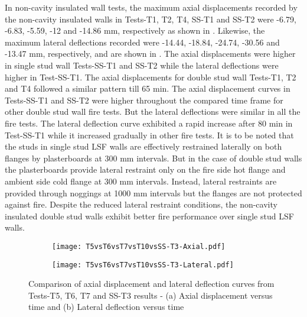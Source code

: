In non-cavity insulated wall tests, the maximum axial displacements recorded by the non-cavity insulated walls in Tests-T1, T2, T4, SS-T1 and SS-T2 were -6.79, -6.83, -5.59, -12 and -14.86 mm, respectively as shown in . Likewise, the maximum lateral deflections recorded were -14.44, -18.84, -24.74, -30.56 and -13.47 mm, respectively, and are shown in . The axial displacements were higher in single stud wall Tests-SS-T1 and SS-T2 while the lateral deflections were higher in Test-SS-T1. The axial displacements for double stud wall Tests-T1, T2 and T4 followed a similar pattern till 65 min. The axial displacement curves in Tests-SS-T1 and SS-T2 were higher throughout the compared time frame for other double stud wall fire tests. But the lateral deflections were similar in all the fire tests. The lateral deflection curve exhibited a rapid increase after 80 min in Test-SS-T1 while it increased gradually in other fire tests. It is to be noted that the studs in single stud LSF walls are effectively restrained laterally on both flanges by plasterboards at 300 mm intervals. But in the case of double stud walls the plasterboards provide lateral restraint only on the fire side hot flange and ambient side cold flange at 300 mm intervals. Instead, lateral restraints are provided through noggings at 1000 mm intervals but the flanges are not protected against fire. Despite the reduced lateral restraint conditions, the non-cavity insulated double stud walls exhibit better fire performance over single stud LSF walls.
\begin{figure}[!htbp]
	\centering
	\begin{subfigure}[b]{0.7\textwidth}
		\centering
		\texttt{[image: T5vsT6vsT7vsT10vsSS-T3-Axial.pdf]}
		\caption{}
		\label{subfig:T5vsT6vsT7vsT10vsSS-T3-Axial}
	\end{subfigure}
	\begin{subfigure}[b]{0.7\textwidth}
		\centering
		\texttt{[image: T5vsT6vsT7vsT10vsSS-T3-Lateral.pdf]}
		\caption{}
		\label{subfig:T5vsT6vsT7vsT10vsSS-T3-Lateral}
	\end{subfigure}
	   \caption{Comparison of axial displacement and lateral deflection curves from Tests-T5, T6, T7 and SS-T3 results - (a) Axial displacement versus time and (b) Lateral deflection versus time}
	   \label{fig:T5vsT6vsT7vsT10vsSS-T3-Displacement}
\end{figure}

